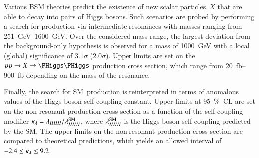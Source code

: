 Various BSM theories predict the existence of new scalar particles~$X$ that are
able to decay into pairs of Higgs bosons. Such scenarios are probed by
performing a search for \HH production via intermediate resonances with masses
ranging from \SIrange{251}{1600}{\GeV}. Over the considered mass range, the
largest deviation from the background-only hypothesis is observed for a mass of
\SI{1000}{\GeV} with a local (global) significance of $3.1\sigma$
($2.0\sigma$). Upper limits are set on the $\pp \to X \to \HH$ production cross
section, which range from \SIrange{20}{900}{\femto\barn} depending on the mass
of the resonance.

Finally, the search for SM~\HH production is reinterpreted in terms of anomalous
values of the Higgs boson self-coupling constant. Upper limits at
\SI{95}{\percent}~CL are set on the non-resonant \HH production cross section as
a function of the self-coupling modifier
$\kappa_{\lambda} = \lambda_{HHH} / \lambda_{HHH}^{\text{SM}}$, where $\lambda_{HHH}^{\text{SM}}$
is the Higgs boson self-coupling predicted by the SM. The upper limits on the
non-resonant \HH production cross section are compared to theoretical
predictions, which yields an allowed \klambda interval of
$\num{-2.4} \leq \kappa_{\lambda} \leq 9.2$.

%


